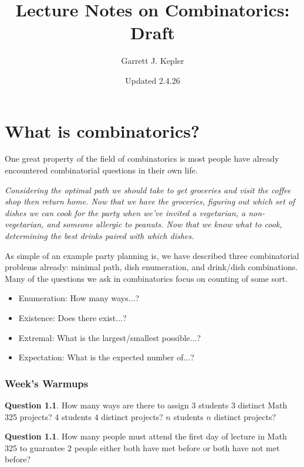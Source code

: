 \documentclass[openany]{book}
\title{Lecture Notes on Combinatorics: Draft}
\author{Garrett J. Kepler}
\date{Updated 2.4.26}
\theoremstyle{definition}
\newtheorem{question}[thm]{Question}
\begin{document}
\maketitle


\chapter{What is combinatorics?}

One great property of the field of combinatorics is most people have already encountered combinatorial questions in their own life.
\begin{center}
\emph{Considering the optimal path we should take to get groceries and visit the coffee shop then return home. Now that we have the groceries, figuring out which set of dishes we can cook for the party when we've invited a vegetarian, a non-vegetarian, and someone allergic to peanuts. Now that we know what to cook, determining the best drinks paired with which dishes.}
\end{center}
As simple of an example party planning is, we have described three combinatorial problems already: minimal path, dish enumeration, and drink/dish combinations. \\
Many of the questions we ask in combinatorics focus on counting of some sort. 


\begin{itemize}
    \item Enumeration: How many ways$\dots$?
    \item Existence: Does there exist$\dots$?
    \item Extremal: What is the largest/smallest possible$\dots$?
    \item Expectation: What is the expected number of$\dots$?
\end{itemize}

\subsection{Week's Warmups}

\begin{question}\hfill

    How many ways are there to assign 3 students 3 distinct Math 325 projects? 4 students 4 distinct projects? $n$ students $n$ distinct projects?
\end{question}

\begin{question}\hfill

    How many people must attend the first day of lecture in Math 325 to guarantee 2 people either both have met before or both have not met before?
\end{question}
\end{document}
